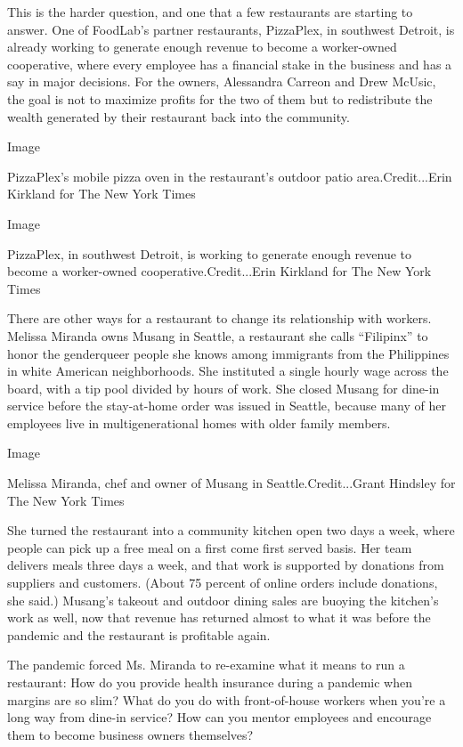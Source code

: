 This is the harder question, and one that a few restaurants are starting
to answer. One of FoodLab's partner restaurants, PizzaPlex, in southwest
Detroit, is already working to generate enough revenue to become a
worker-owned cooperative, where every employee has a financial stake in
the business and has a say in major decisions. For the owners,
Alessandra Carreon and Drew McUsic, the goal is not to maximize profits
for the two of them but to redistribute the wealth generated by their
restaurant back into the community.

Image

PizzaPlex's mobile pizza oven in the restaurant's outdoor patio
area.Credit...Erin Kirkland for The New York Times

Image

PizzaPlex, in southwest Detroit, is working to generate enough revenue
to become a worker-owned cooperative.Credit...Erin Kirkland for The New
York Times

There are other ways for a restaurant to change its relationship with
workers. Melissa Miranda owns Musang in Seattle, a restaurant she calls
``Filipinx'' to honor the genderqueer people she knows among immigrants
from the Philippines in white American neighborhoods. She instituted a
single hourly wage across the board, with a tip pool divided by hours of
work. She closed Musang for dine-in service before the stay-at-home
order was issued in Seattle, because many of her employees live in
multigenerational homes with older family members.

Image

Melissa Miranda, chef and owner of Musang in Seattle.Credit...Grant
Hindsley for The New York Times

She turned the restaurant into a community kitchen open two days a week,
where people can pick up a free meal on a first come first served basis.
Her team delivers meals three days a week, and that work is supported by
donations from suppliers and customers. (About 75 percent of online
orders include donations, she said.) Musang's takeout and outdoor dining
sales are buoying the kitchen's work as well, now that revenue has
returned almost to what it was before the pandemic and the restaurant is
profitable again.

The pandemic forced Ms. Miranda to re-examine what it means to run a
restaurant: How do you provide health insurance during a pandemic when
margins are so slim? What do you do with front-of-house workers when
you're a long way from dine-in service? How can you mentor employees and
encourage them to become business owners themselves?

